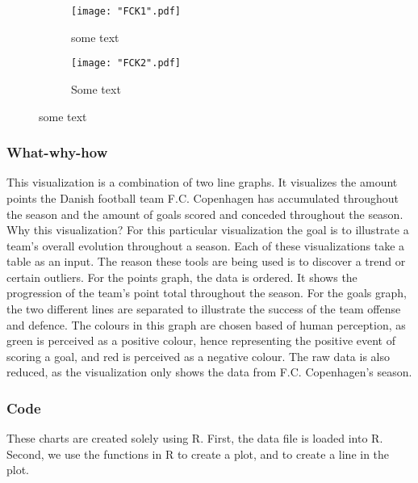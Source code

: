 \documentclass[Report.tex]{subfiles}
\begin{document}
\begin{figure}
\center
\begin{subfigure}[b]{0.8\textwidth}
\texttt{[image: "FCK1".pdf]}
\caption{some text}
\end{subfigure}

\begin{subfigure}[b]{0.8\textwidth}
\texttt{[image: "FCK2".pdf]}
\caption{Some text}
\end{subfigure}
\caption{some text}
\end{figure}


\subsubsection{What-why-how}
This visualization is a combination of two line graphs. It visualizes the amount points the Danish football team F.C. Copenhagen has accumulated throughout the season and the amount of goals scored and conceded throughout the season. Why this visualization? For this particular visualization the goal is to illustrate a team’s overall evolution throughout a season. Each of these visualizations take a table as an input. The reason these tools are being used is to discover a trend or certain outliers. For the points graph, the data is ordered. It shows the progression of the team’s point total throughout the season. For the goals graph, the two different lines are separated to illustrate the success of the team offense and defence. The colours in this graph are chosen based of human perception, as green is perceived as a positive colour, hence representing the positive event of scoring a goal, and red is perceived as a negative colour. The raw data is also reduced, as the visualization only shows the data from F.C. Copenhagen’s season. 
\subsubsection{Code}
These charts are created solely using R. First, the data file is loaded into R. Second, we use the functions in R to create a plot, and to create a line in the plot. 
\end{document}
